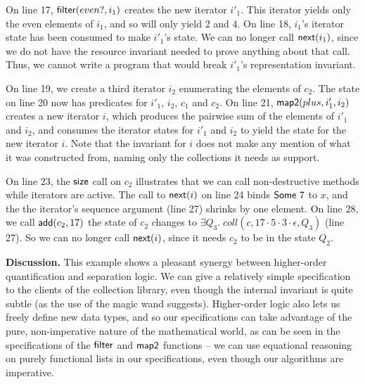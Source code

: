\documentclass[preprint,natbib]{sigplanconf}
\begin{document}
On line 17, $\mbox{\textsf{{filter}}}(even?, i_1)$ creates the new iterator
$i'_1$. This iterator yields only the even elements of $i_1$, and so
will only yield 2 and 4. On line 18, $i_1$'s iterator state has been
consumed to make $i'_1$'s state. We can no longer call
$\mbox{\textsf{{next}}}(i_1)$, since we do not have the resource invariant
needed to prove anything about that call. Thus, we cannot write a
program that would break $i'_1$'s representation invariant.

On line 19, we create a third iterator $i_2$ enumerating the elements
of $c_2$. The state on line 20 now has predicates for $i'_1$, $i_2$,
$c_1$ and $c_2$. On line 21, $\mbox{\textsf{{map2}}}(plus, i'_1, i_2)$ creates a
new iterator $i$, which produces the pairwise sum of the elements of
$i'_1$ and $i_2$, and consumes the iterator states for $i'_1$ and
$i_2$ to yield the state for the new iterator $i$. Note that the 
invariant for $i$ does not make any mention of what it was constructed
from, naming only the collections it needs as support. 

On line 23, the $\mbox{\textsf{{size}}}$ call on $c_2$ illustrates that we can
call non-destructive methods while iterators are active. The call to
$\mbox{\textsf{{next}}}(i)$ on line 24 binds $\mbox{\textsf{{Some }}}7$ to $x$, and the
the iterator's sequence argument (line 27) shrinks by one element. On
line 28, we call $\mbox{\textsf{{add}}}(c_2, 17)$ the state of $c_2$ changes to
$\exists Q_3.\; coll(c, 17\cdot 5 \cdot 3\cdot\epsilon, Q_3)$ (line
27). So we can no longer call $\mbox{\textsf{{next}}}(i)$, since it needs $c_2$
to be in the state $Q_2$.

\textbf{Discussion.} This example shows a pleasant synergy between
higher-order quantification and separation logic. We can give a
relatively simple specification to the clients of the collection
library, even though the internal invariant is quite subtle (as the
use of the magic wand suggests). Higher-order logic also lets us
freely define new data types, and so our specifications can take
advantage of the pure, non-imperative nature of the mathematical
world, as can be seen in the specifications of the $\mbox{\textsf{{filter}}}$
and $\mbox{\textsf{{map2}}}$ functions -- we can use equational reasoning on
purely functional lists in our specifications, even though our
algorithms are imperative.
\end{document}
